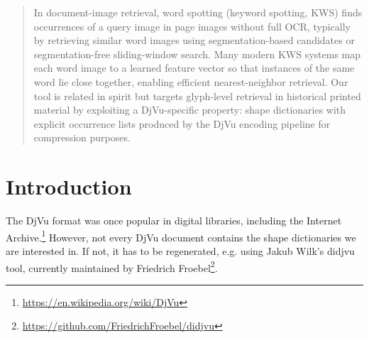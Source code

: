\documentclass[a0,portrait]{a0poster}
\begin{document}
\begin{multicols}{2} %


\color{Navy} %

\begin{abstract}
  In document-image retrieval, word spotting (keyword spotting, KWS)
  finds occurrences of a query image in page images without full OCR,
  typically by retrieving similar word images using segmentation-based
  candidates or segmentation-free sliding-window search. Many modern
  KWS systems map each word image to a learned feature vector so that
  instances of the same word lie close together, enabling efficient
  nearest-neighbor retrieval. Our tool is related in spirit but
  targets glyph-level retrieval in historical printed material by
  exploiting a DjVu-specific property: shape dictionaries with
  explicit occurrence lists produced by the DjVu encoding
  pipeline for compression purposes.
\end{abstract}


\color{SaddleBrown} %

\section*{Introduction}

The DjVu format was once popular in  digital libraries, including
the Internet Archive.\footnote{\url{https://en.wikipedia.org/wiki/DjVu}}
However, not every DjVu document contains the shape dictionaries we are
interested in. If not, it has to be regenerated, e.g. using Jakub Wilk's
\textsf{didjvu} tool, currently maintained by Friedrich
Froebel\footnote{\url{https://github.com/FriedrichFroebel/didjvu}}.


\end{multicols}
\end{document}
